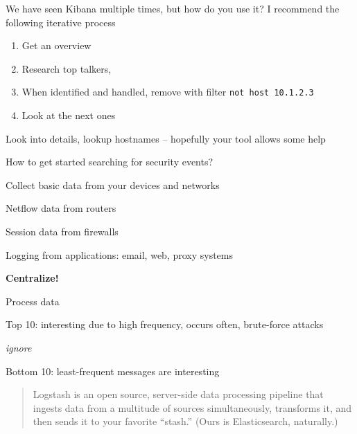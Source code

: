 \documentclass[Screen16to9,17pt]{foils}
\begin{document}
\begin{quote}

\end{quote}

We have seen Kibana multiple times, but how do you use it? I recommend the following iterative process
\begin{enumerate}
\item Get an overview
\item Research top talkers,
\item When identified and handled, remove with filter \verb+not host 10.1.2.3+
\item Look at the next ones
\end{enumerate}

Look into details, lookup hostnames -- hopefully your tool allows some help





\begin{list1}
\item How to get started searching for security events?
\item Collect basic data from your devices and networks
\begin{list2}
\item Netflow data from routers
\item Session data from firewalls
\item Logging from applications: email, web, proxy systems
\end{list2}
\item {\bf Centralize!}
\item Process data
\begin{list2}
\item Top 10: interesting due to high frequency, occurs often, brute-force attacks
\item {\it ignore}
\item Bottom 10: least-frequent messages are interesting
\end{list2}
\end{list1}






\begin{quote}
  Logstash is an open source, server-side data processing pipeline that ingests data from a multitude of sources simultaneously, transforms it, and then sends it to your favorite “stash.” (Ours is Elasticsearch, naturally.)\\
\end{quote}
\end{document}
